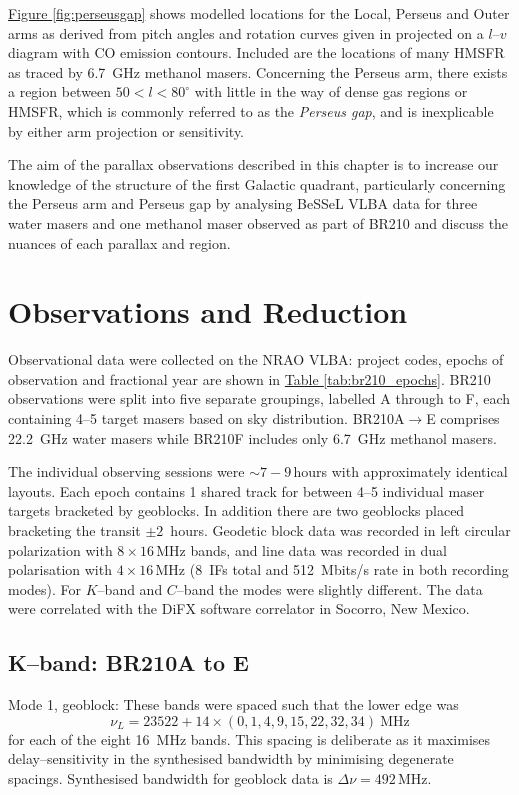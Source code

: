         \hyperref[fig:perseusgap]{Figure \ref*{fig:perseusgap}} shows modelled locations for the Local, Perseus and Outer arms as derived from pitch angles and rotation curves given in \citet{Reid2019} projected on a $l$--$v$ diagram with CO emission contours. Included are the locations of many HMSFR as traced by 6.7~GHz methanol masers. Concerning the Perseus arm, there exists a region between $50<l<80^\circ$ with little in the way of dense gas regions or HMSFR, which is commonly referred to as the {\it Perseus gap}, and is inexplicable by either arm projection or sensitivity. 
        
        The aim of the parallax observations described in this chapter is to increase our knowledge of the structure of the first Galactic quadrant, particularly concerning the Perseus arm and Perseus gap by analysing BeSSeL VLBA data for three water masers and one methanol maser observed as part of BR210 and discuss the nuances of each parallax and region.
       
    \section{Observations and Reduction}    
        Observational data were collected on the NRAO VLBA: project codes, epochs of observation and fractional year are shown in \hyperref[tab:br210_epochs]{Table \ref*{tab:br210_epochs}}. BR210 observations were split into five separate groupings, labelled A through to F, each containing 4--5 target masers based on sky distribution. BR210A$\rightarrow$E comprises 22.2~GHz water masers while BR210F includes only 6.7~GHz methanol masers.
        
        The individual observing sessions were $\sim7-9$\,hours with approximately identical layouts. Each epoch contains 1 shared track for between 4--5 individual maser targets bracketed by geoblocks. In addition there are two geoblocks placed bracketing the transit $\pm2$~hours. Geodetic block data was recorded in left circular polarization with $8\times16$\,MHz bands, and line data was recorded in dual polarisation with $4\times16$\,MHz (8~IFs total and 512~Mbits/s rate in both recording modes). For $K$--band and $C$--band the modes were slightly different. The data were correlated with the DiFX software correlator \citep{Deller2011} in Socorro, New Mexico.
      
		\subsection{K--band: BR210A to E}
			Mode 1, geoblock: These bands were spaced such that the lower edge was 
			\begin{equation*}
			\nu_L = 23522+14\times(0,1,4,9,15,22,32,34)~\text{MHz}
			\end{equation*} for each of the eight 16~MHz bands. This spacing is deliberate as it maximises delay--sensitivity in the synthesised bandwidth by minimising degenerate spacings. Synthesised bandwidth for geoblock data is $\Delta\nu=492$\,MHz. 
			

